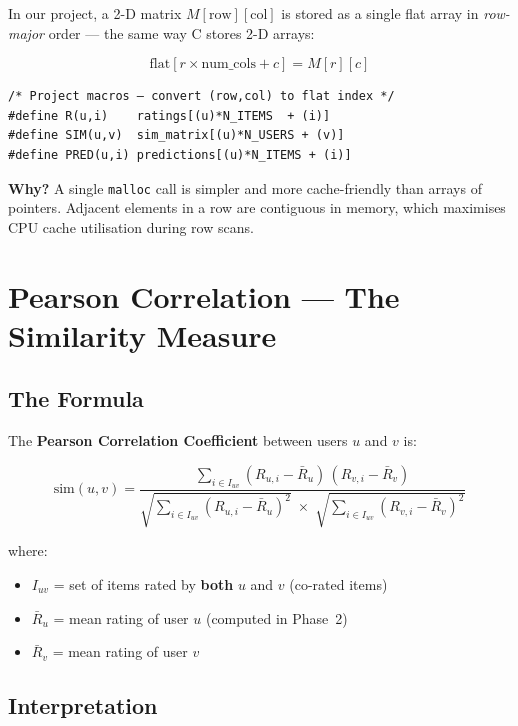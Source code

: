 \documentclass[12pt,a4paper]{article}
\begin{document}
In our project, a 2-D matrix $M[\text{row}][\text{col}]$ is stored as a single
flat array in \emph{row-major} order — the same way C stores 2-D arrays:

\[
\text{flat}[r \times \text{num\_cols} + c] = M[r][c]
\]

\begin{lstlisting}
/* Project macros — convert (row,col) to flat index */
#define R(u,i)    ratings[(u)*N_ITEMS  + (i)]
#define SIM(u,v)  sim_matrix[(u)*N_USERS + (v)]
#define PRED(u,i) predictions[(u)*N_ITEMS + (i)]
\end{lstlisting}

\textbf{Why?}  A single \texttt{malloc} call is simpler and more cache-friendly
than arrays of pointers.  Adjacent elements in a row are contiguous in memory,
which maximises CPU cache utilisation during row scans.

\section{Pearson Correlation — The Similarity Measure}

\subsection{The Formula}

The \textbf{Pearson Correlation Coefficient} between users $u$ and $v$ is:

\[
\text{sim}(u,v) = \frac
{ \displaystyle\sum_{i \in I_{uv}} (R_{u,i} - \bar{R}_u)\,(R_{v,i} - \bar{R}_v) }
{ \sqrt{\displaystyle\sum_{i \in I_{uv}} (R_{u,i} - \bar{R}_u)^2} \;\times\;
  \sqrt{\displaystyle\sum_{i \in I_{uv}} (R_{v,i} - \bar{R}_v)^2} }
\]

where:
\begin{itemize}
    \item $I_{uv}$ = set of items rated by \textbf{both} $u$ and $v$
          (co-rated items)
    \item $\bar{R}_u$ = mean rating of user $u$ (computed in Phase~2)
    \item $\bar{R}_v$ = mean rating of user $v$
\end{itemize}

\subsection{Interpretation}
\end{document}
